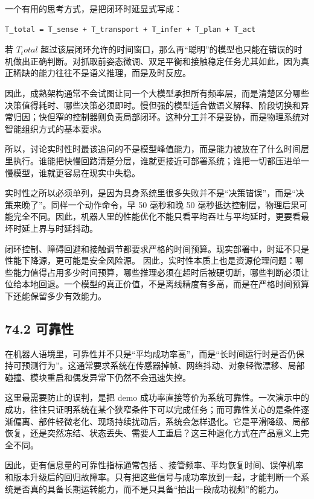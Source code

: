 一个有用的思考方式，是把闭环时延显式写成：

\begin{lstlisting}
T_total = T_sense + T_transport + T_infer + T_plan + T_act
\end{lstlisting}

若 \(T_total\) 超过该层闭环允许的时间窗口，那么再“聪明”的模型也只能在错误的时机做出正确判断。对抓取前姿态微调、双足平衡和接触稳定任务尤其如此，因为真正稀缺的能力往往不是语义推理，而是及时反应。

因此，成熟架构通常不会试图让同一个大模型承担所有频率层，而是清楚区分哪些决策值得耗时、哪些决策必须即时。慢但强的模型适合做语义解释、阶段切换和异常归因；快但窄的控制器则负责局部闭环。这种分工并不是妥协，而是物理系统对智能组织方式的基本要求。

所以，讨论实时性时最该追问的不是模型峰值能力，而是能力被放在了什么时间层里执行。谁能把快慢回路清楚分层，谁就更接近可部署系统；谁把一切都压进单一慢模型，谁就更容易在现实中失稳。

实时性之所以必须单列，是因为具身系统里很多失败并不是“决策错误”，而是“决策来晚了”。同样一个动作命令，早 50 毫秒和晚 50 毫秒抵达控制层，物理后果可能完全不同。因此，机器人里的性能优化不能只看平均吞吐与平均延时，更要看最坏时延上界与时延抖动。

闭环控制、障碍回避和接触调节都要求严格的时间预算。现实部署中，时延不只是性能下降源，更可能是安全风险源。 因此，实时性本质上也是资源伦理问题：哪些能力值得占用多少时间预算，哪些推理必须在超时后被硬切断，哪些判断必须让位给本地回退。一个模型的真正价值，不是离线精度有多高，而是在严格时间预算下还能保留多少有效能力。

\subsection*{74.2 可靠性}


在机器人语境里，可靠性并不只是“平均成功率高”，而是“长时间运行时是否仍保持可预测行为”。这通常要求系统在传感器掉帧、网络抖动、对象轻微漂移、局部碰撞、模块重启和偶发异常下仍然不会迅速失控。

这里最需要防止的误判，是把 demo 成功率直接等价为系统可靠性。一次演示中的成功，往往只证明系统在某个狭窄条件下可以完成任务；而可靠性关心的是条件逐渐偏离、部件轻微老化、现场持续扰动后，系统会怎样退化。它是平滑降级、局部恢复，还是突然冻结、状态丢失、需要人工重启？这三种退化方式在产品意义上完全不同。

因此，更有信息量的可靠性指标通常包括 \texttt{}、接管频率、平均恢复时间、误停机率和版本升级后的回归故障率。只有把这些信号与成功率放到一起，才能判断一个系统是否真的具备长期运转能力，而不是只具备“拍出一段成功视频”的能力。

